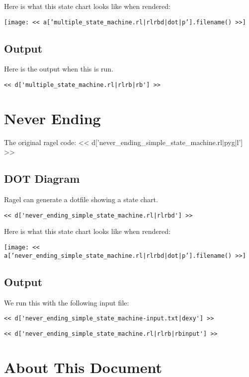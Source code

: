 \documentclass[a4paper]{article}
\begin{document}
Here is what this state chart looks like when rendered:

\texttt{[image: << a['multiple\_state\_machine.rl|rlrbd|dot|p'].filename() >>]}

\subsection{Output}

Here is the output when this is run.

\begin{Verbatim}
<< d['multiple_state_machine.rl|rlrb|rb'] >>
\end{Verbatim}

\section{Never Ending}

The original ragel code:
<< d['never_ending_simple_state_machine.rl|pyg|l'] >>

\subsection{DOT Diagram}

Ragel can generate a dotfile showing a state chart.

\begin{Verbatim}
<< d['never_ending_simple_state_machine.rl|rlrbd'] >>
\end{Verbatim}

Here is what this state chart looks like when rendered:

\texttt{[image: << a['never\_ending\_simple\_state\_machine.rl|rlrbd|dot|p'].filename() >>]}

\subsection{Output}

We run this with the following input file:
\begin{Verbatim}
<< d['never_ending_simple_state_machine-input.txt|dexy'] >>
\end{Verbatim}

\begin{Verbatim}
<< d['never_ending_simple_state_machine.rl|rlrb|rbinput'] >>
\end{Verbatim}

\section{About This Document}
\end{document}
